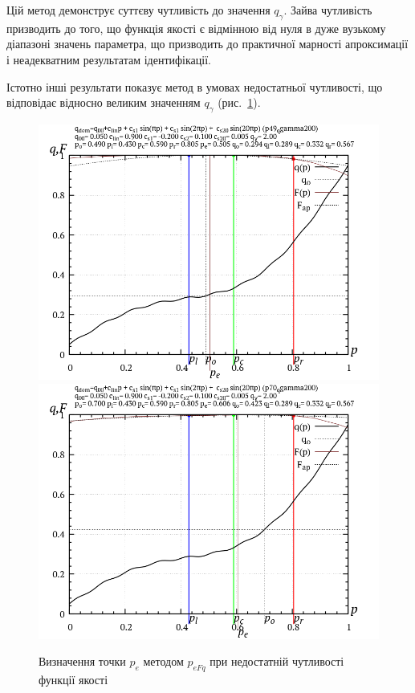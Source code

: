 Цій метод демонструє суттєву чутливість до значення $q_\gamma$.
Зайва чутливість призводить до того, що функція якості є відмінною від нуля в
дуже вузькому діапазоні значень параметра, що призводить до практичної
марності апроксимації і неадекватним результатам
ідентифікації.

Істотно інші результати показує метод в умовах недостатньої
чутливості, що відповідає відносно великим значенням
$q_\gamma$ (рис.~\ref{atu:f:p_eFq_intra_200}).

\begin{figure}[htb!]
  \begin{center}
    \includegraphics[width=49\TW]{p/p_eFq/q_p_eFq_p49_qgamma200.png}
    \hfill
    \includegraphics[width=49\TW]{p/p_eFq/q_p_eFq_p70_qgamma200.png}
  \end{center}
\caption{Визначення точки $ p_e $ методом $p_{eFq}$ при недостатній чутливості функції якості}
\label{atu:f:p_eFq_intra_200}
\end{figure}

